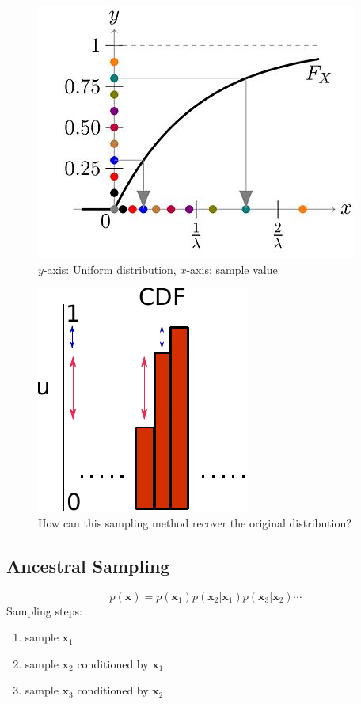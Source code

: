 \begin{figure}[t]
	\begin{center}
		\includegraphics[scale=0.6]{./images/sampling/inverse.jpg}
	\end{center}
	\caption{$y$-axis: Uniform distribution, $x$-axis: sample value}
\end{figure}

\begin{figure}[t]
	\begin{center}
		\includegraphics[scale=1.2]{./images/sampling/cdf.pdf}
	\end{center}
	\caption{How can this sampling method recover the original distribution?}
\end{figure}

\subsection{Ancestral Sampling}
$$p(\mathbf{x}) = p(\mathbf{x}_1)p(\mathbf{x}_2|\mathbf{x}_1)p(\mathbf{x}_3|\mathbf{x}_2)\cdots$$
Sampling steps:
\begin{enumerate}
	\item sample $\mathbf{x}_1$
	\item sample $\mathbf{x}_2$ conditioned by $\mathbf{x}_1$
	\item sample $\mathbf{x}_3$ conditioned by $\mathbf{x}_2$
\end{enumerate}



